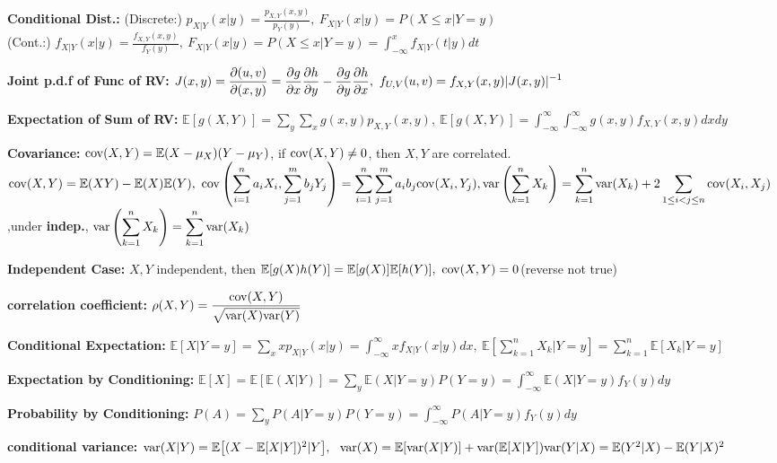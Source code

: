 \documentclass[10pt, a4paper]{article}
\newcommand{\E}{{\mathbb{E}}}
\newcommand{\var}{{\rm var}}
\newcommand{\disp}{\displaystyle}
\begin{document}
\begin{spacing}{1}
    {\bf Conditional Dist.: }
    (Discrete:) $\disp p_{X|Y}(x|y)=\frac{p_{X,Y}(x,y)}{p_Y(y)},\ 
    F_{X|Y}(x|y)=P(X\le x|Y=y)$\\
    (Cont.:) $\disp f_{X|Y}(x|y)=\frac{f_{X,Y}(x,y)}{f_Y(y)},\ 
    F_{X|Y}(x|y)=P(X\le x|Y=y)=\int_{-\infty}^x f_{X|Y}(t|y)dt$

    {\bf Joint p.d.f of Func of RV: }
    $\disp J(x,y)=\frac{\pt (u,v)}{\pt (x,y)}=
    \frac{\pt g}{\pt x}\frac{\pt h}{\pt y}-\frac{\pt g}{\pt y}\frac{\pt h}{\pt x},\ 
    f_{U,V}(u,v)=f_{X,Y}(x,y)|J(x,y)|^{-1}$

    \vspace{0.25in}
    {\bf Expectation of Sum of RV: }
    $\disp \E[g(X,Y)]=\sum_y \sum_x g(x,y)p_{X,Y}(x,y),\ 
    \E[g(X,Y)]=\int_{-\infty}^{\infty} \int_{-\infty}^{\infty} g(x,y) f_{X,Y}(x,y)dxdy$

    \newcommand{\cov}{{\rm cov}}
    {\bf Covariance: } ${\rm cov}(X,Y)=\E(X-\mu_X)(Y-\mu_Y)$, 
    if ${\rm cov}(X,Y)\ne 0$, then $X, Y$ are correlated.\\
    $\disp \cov(X,Y)=\E(XY)-\E(X)\E(Y),\ 
    \cov\left(\sum_{i=1}^n a_iX_i, \sum_{j=1}^m b_jY_j\right)=
    \sum_{i=1}^n \sum_{j=1}^m a_ib_j\cov(X_i,Y_j),\\ 
    \var\left(\sum_{k=1}^n X_k\right)=\sum_{k=1}^n \var(X_k)+
    2\sum_{1\le i<j\le n} \cov(X_i,X_j)$,\qquad under {\bf indep.},
    $\disp \var\left(\sum_{k=1}^n X_k\right)=\sum_{k=1}^n \var(X_k)$

    {\bf Independent Case: } $X,Y$ independent, then 
    $\E[g(X)h(Y)]=\E[g(X)]\E[h(Y)],\ \cov(X,Y)=0$(reverse not true)

    {\bf correlation coefficient:} $\disp \rho(X,Y)=\frac{\cov(X,Y)}{\sqrt{\var(X)\var(Y)}}$

    {\bf Conditional Expectation:} 
    $\disp \E[X|Y=y]=\sum_{x} xp_{X|Y}(x|y)=\int_{-\infty}^{\infty} xf_{X|Y}(x|y) dx,\ 
    \E\left[\sum_{k=1}^n X_k|Y=y\right]=\sum_{k=1}^n \E[X_k|Y=y]$

    {\bf Expectation by Conditioning:} 
    $\disp \E[X]=\E[\E(X|Y)]=\sum_{y} \E(X|Y=y)P(Y=y)=\int_{-\infty}^{\infty}\E(X|Y=y)f_Y(y)dy$

    {\bf Probability by Conditioning:}
    $\disp P(A)=\sum_y P(A|Y=y)P(Y=y)=\int_{-\infty}^{\infty}P(A|Y=y)f_Y(y)dy$

    {\bf conditional variance: }
    $\var(X|Y)=\E\bigl[(X-\E[X|Y])^2|Y\bigr],\ \ 
    \var(X)=\E[\var(X|Y)]+\var(\E[X|Y])\\
    \var(Y|X)=\E(Y^2|X)-\E(Y|X)^2$


\end{spacing}
\end{document}
